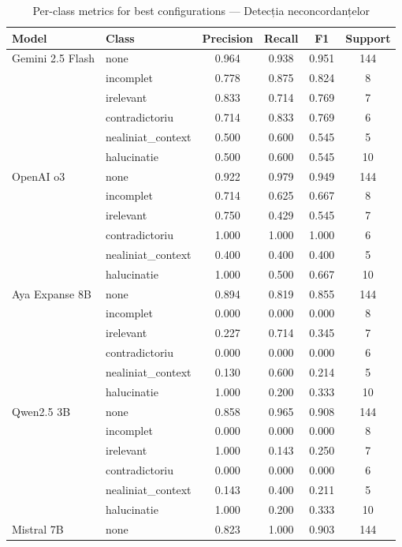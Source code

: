 \begin{table}[H]
\centering
\footnotesize
\caption{Per-class metrics for best configurations — Detecția neconcordanțelor}
\label{tab:per-class-incongruity-detection}
\begin{tabular}{llcccc}
\toprule
\textbf{Model} & \textbf{Class} & \textbf{Precision} & \textbf{Recall} & \textbf{F1} & \textbf{Support} \\
\midrule
Gemini 2.5 Flash & none & 0.964 & 0.938 & 0.951 & 144 \\
 & incomplet & 0.778 & 0.875 & 0.824 & 8 \\
 & irelevant & 0.833 & 0.714 & 0.769 & 7 \\
 & contradictoriu & 0.714 & 0.833 & 0.769 & 6 \\
 & nealiniat\_context & 0.500 & 0.600 & 0.545 & 5 \\
 & halucinatie & 0.500 & 0.600 & 0.545 & 10 \\
\midrule
OpenAI o3 & none & 0.922 & 0.979 & 0.949 & 144 \\
 & incomplet & 0.714 & 0.625 & 0.667 & 8 \\
 & irelevant & 0.750 & 0.429 & 0.545 & 7 \\
 & contradictoriu & 1.000 & 1.000 & 1.000 & 6 \\
 & nealiniat\_context & 0.400 & 0.400 & 0.400 & 5 \\
 & halucinatie & 1.000 & 0.500 & 0.667 & 10 \\
\midrule
Aya Expanse 8B & none & 0.894 & 0.819 & 0.855 & 144 \\
 & incomplet & 0.000 & 0.000 & 0.000 & 8 \\
 & irelevant & 0.227 & 0.714 & 0.345 & 7 \\
 & contradictoriu & 0.000 & 0.000 & 0.000 & 6 \\
 & nealiniat\_context & 0.130 & 0.600 & 0.214 & 5 \\
 & halucinatie & 1.000 & 0.200 & 0.333 & 10 \\
\midrule
Qwen2.5 3B & none & 0.858 & 0.965 & 0.908 & 144 \\
 & incomplet & 0.000 & 0.000 & 0.000 & 8 \\
 & irelevant & 1.000 & 0.143 & 0.250 & 7 \\
 & contradictoriu & 0.000 & 0.000 & 0.000 & 6 \\
 & nealiniat\_context & 0.143 & 0.400 & 0.211 & 5 \\
 & halucinatie & 1.000 & 0.200 & 0.333 & 10 \\
\midrule
Mistral 7B & none & 0.823 & 1.000 & 0.903 & 144 \\

\end{tabular}
\end{table}
